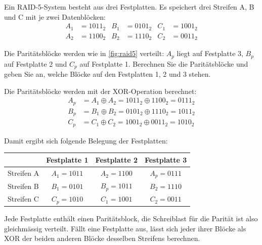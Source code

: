 \begin{myexercise}
    Ein \acrshort{RAID}-5-System besteht aus drei Festplatten. Es speichert drei Streifen A, B und C mit je zwei Datenblöcken:
    \begin{align*}
        A_1 & = 1011_2 & B_1 & = 0101_2 & C_1 & = 1001_2 \\
        A_2 & = 1100_2 & B_2 & = 1110_2 & C_2 & = 0011_2
    \end{align*}

    Die Paritätsblöcke werden wie in \cref{fig:raid5} verteilt: $A_p$ liegt auf Festplatte 3, $B_p$ auf Festplatte 2 und $C_p$ auf Festplatte 1. Berechnen Sie die Paritätsblöcke und geben Sie an, welche Blöcke auf den Festplatten 1, 2 und 3 stehen.

    \begin{myanswer}
        Die Paritätsblöcke werden mit der \acrshort{XOR}-Operation berechnet:
        \begin{align*}
            A_p & = A_1 \oplus A_2 = 1011_2 \oplus 1100_2 = 0111_2 \\
            B_p & = B_1 \oplus B_2 = 0101_2 \oplus 1110_2 = 1011_2 \\
            C_p & = C_1 \oplus C_2 = 1001_2 \oplus 0011_2 = 1010_2
        \end{align*}

        Damit ergibt sich folgende Belegung der Festplatten:

        \begin{center}
            \begin{tabular}{lccc}
                           & \textbf{Festplatte 1} & \textbf{Festplatte 2} & \textbf{Festplatte 3} \\\midrule
                Streifen A & $A_1 = 1011$          & $A_2 = 1100$          & $A_p = 0111$          \\
                Streifen B & $B_1 = 0101$          & $B_p = 1011$          & $B_2 = 1110$          \\
                Streifen C & $C_p = 1010$          & $C_1 = 1001$          & $C_2 = 0011$          \\
            \end{tabular}
        \end{center}

        Jede Festplatte enthält einen Paritätsblock, die Schreiblast für die Parität ist also gleichmässig verteilt. Fällt eine Festplatte aus, lässt sich jeder ihrer Blöcke als \acrshort{XOR} der beiden anderen Blöcke desselben Streifens berechnen.
    \end{myanswer}
\end{myexercise}

